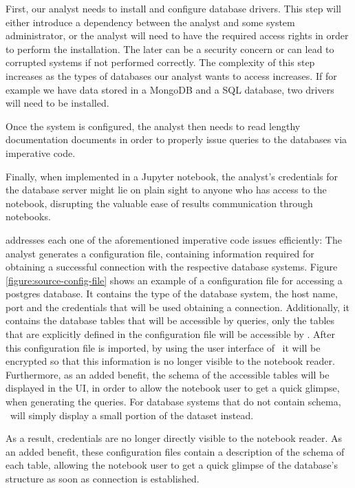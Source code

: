 First, our analyst needs to install and configure database drivers. This step will either introduce a dependency between the analyst and some system administrator, or the analyst will need to have the required access rights in order to perform the installation. The later can be a security concern or can lead to corrupted systems if not performed correctly. The complexity of this step increases as the types of databases our analyst wants to access increases. If for example we have data stored in a MongoDB and a SQL database, two drivers will need to be installed.

Once the system is configured, the analyst then needs to read lengthy documentation documents in order to properly issue queries to the databases via imperative code.

Finally, when implemented in a Jupyter notebook, the analyst's credentials for the database server might lie on plain sight to anyone who has access to the notebook, disrupting the valuable ease of results communication through notebooks.

{\projname} addresses each one of the aforementioned imperative code issues efficiently: The analyst generates a configuration file, containing information required for obtaining a successful connection with the respective database systems. Figure \ref{figure:source-config-file} shows an example of a configuration file for accessing a postgres database. It contains the type of the database system, the host name, port and the credentials that will be used obtaining a connection. Additionally, it contains the database tables that will be accessible by queries, only the tables that are explicitly defined in the configuration file will be accessible by \projname. After this configuration file is imported, by using the user interface of \projname\, it will be encrypted so that this information is no longer visible to the notebook reader. Furthermore, as an added benefit, the schema of the accessible tables will be displayed in the UI, in order to allow the notebook user to get a quick glimpse, when generating the queries. For database systems that do not contain schema, \projname\ will simply display a small portion of the dataset instead.


As a result, credentials are no longer directly visible to the notebook reader. As an added benefit, these configuration files contain a description of the schema of each table, allowing the notebook user to get a quick glimpse of the database's structure as soon as connection is established.

